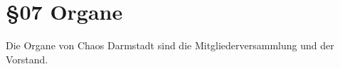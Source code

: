 \section*{§07 Organe}

Die Organe von Chaos Darmstadt sind die Mitgliederversammlung und
der Vorstand.
